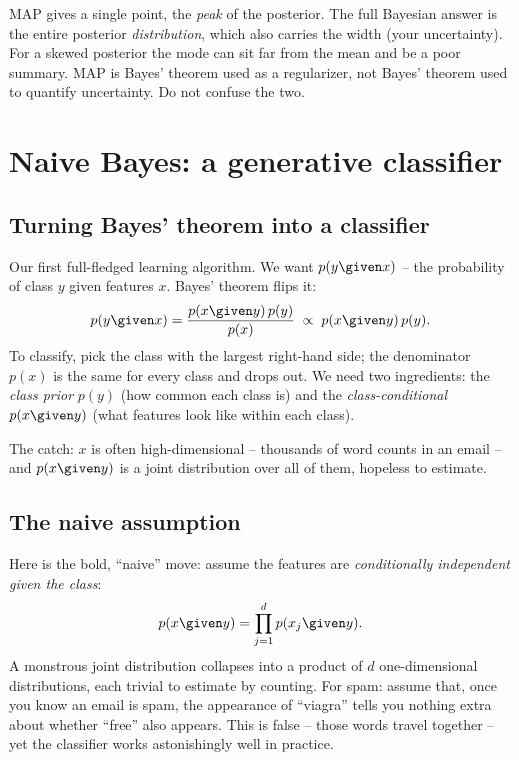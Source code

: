 \begin{trapbox}
MAP gives a single point, the \emph{peak} of the posterior. The full Bayesian
answer is the entire posterior \emph{distribution}, which also carries the width
(your uncertainty). For a skewed posterior the mode can sit far from the mean and
be a poor summary. MAP is Bayes' theorem used as a regularizer, not Bayes' theorem
used to quantify uncertainty. Do not confuse the two.
\end{trapbox}

\section{Naive Bayes: a generative classifier}
\label{ch34:naive-bayes}

\subsection{Turning Bayes' theorem into a classifier}

Our first full-fledged learning algorithm. We want $p(y\given x)$ -- the
probability of class $y$ given features $x$. Bayes' theorem flips it:
\[
  p(y\given x) = \frac{p(x\given y)\,p(y)}{p(x)} \;\propto\; p(x\given y)\,p(y).
\]
To classify, pick the class with the largest right-hand side; the denominator
$p(x)$ is the same for every class and drops out. We need two ingredients: the
\emph{class prior} $p(y)$ (how common each class is) and the \emph{class-conditional}
$p(x\given y)$ (what features look like within each class).

The catch: $x$ is often high-dimensional -- thousands of word counts in an email --
and $p(x\given y)$ is a joint distribution over all of them, hopeless to estimate.

\subsection{The naive assumption}

Here is the bold, ``naive'' move: assume the features are
\emph{conditionally independent given the class}:
\[
  p(x\given y) = \prod_{j=1}^d p(x_j \given y).
\]
A monstrous joint distribution collapses into a product of $d$ one-dimensional
distributions, each trivial to estimate by counting. For spam: assume that, once
you know an email is spam, the appearance of ``viagra'' tells you nothing extra
about whether ``free'' also appears. This is false -- those words travel together --
yet the classifier works astonishingly well in practice.

